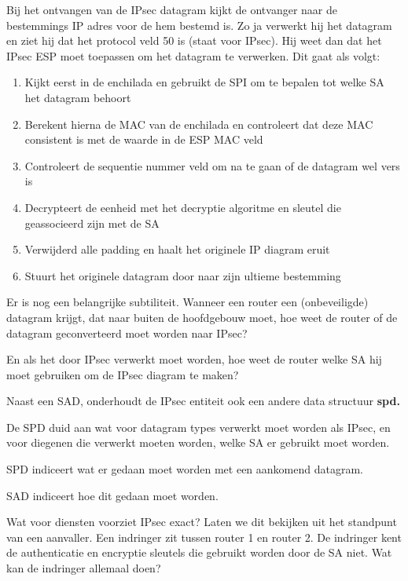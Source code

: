\noindent Bij het ontvangen van de IPsec datagram kijkt de ontvanger naar de bestemmings IP adres voor de hem bestemd is. Zo ja verwerkt hij het datagram en ziet hij dat het protocol veld 50 is (staat voor IPsec). Hij weet dan dat het IPsec ESP moet toepassen om het datagram te verwerken. Dit gaat als volgt:
\begin{enumerate}

\item Kijkt eerst in de enchilada en gebruikt de SPI om te bepalen tot welke SA het datagram behoort
\item Berekent hierna de MAC van de enchilada en controleert dat deze MAC consistent is met de waarde in de ESP MAC veld
\item Controleert de sequentie nummer veld om na te gaan of de datagram wel vers is
\item Decrypteert de eenheid met het decryptie algoritme en sleutel die geassocieerd zijn met de SA
\item Verwijderd alle padding en haalt het originele IP diagram eruit
\item Stuurt het originele datagram door naar zijn ultieme bestemming
\end{enumerate}

\noindent Er is nog een belangrijke subtiliteit. Wanneer een router een (onbeveiligde) datagram krijgt, dat naar buiten de hoofdgebouw moet, hoe weet de router of de datagram geconverteerd moet worden naar IPsec?

\noindent En als het door IPsec verwerkt moet worden, hoe weet de router welke SA hij moet gebruiken om de IPsec diagram te maken?

\noindent Naast een SAD, onderhoudt de IPsec entiteit ook een andere data structuur \textbf{\acrfull{spd}. }

\noindent De SPD duid aan wat voor datagram types verwerkt moet worden als IPsec, en voor diegenen die verwerkt moeten worden, welke SA er gebruikt moet worden.

\noindent SPD indiceert wat er gedaan moet worden met een aankomend datagram.

\noindent SAD indiceert hoe dit gedaan moet worden.




\noindent Wat voor diensten voorziet IPsec exact? Laten we dit bekijken uit het standpunt van een aanvaller.
Een indringer zit tussen router 1 en router 2. De indringer kent de authenticatie en encryptie sleutels die gebruikt worden door de SA niet. Wat kan de indringer allemaal doen?

